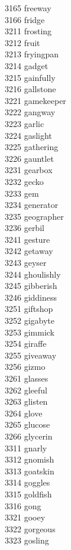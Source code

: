 3165 freeway \\
3166 fridge \\
3211 frosting \\
3212 fruit \\
3213 fryingpan \\
3214 gadget \\
3215 gainfully \\
3216 gallstone \\
3221 gamekeeper \\
3222 gangway \\
3223 garlic \\
3224 gaslight \\
3225 gathering \\
3226 gauntlet \\
3231 gearbox \\
3232 gecko \\
3233 gem \\
3234 generator \\
3235 geographer \\
3236 gerbil \\
3241 gesture \\
3242 getaway \\
3243 geyser \\
3244 ghoulishly \\
3245 gibberish \\
3246 giddiness \\
3251 giftshop \\
3252 gigabyte \\
3253 gimmick \\
3254 giraffe \\
3255 giveaway \\
3256 gizmo \\
3261 glasses \\
3262 gleeful \\
3263 glisten \\
3264 glove \\
3265 glucose \\
3266 glycerin \\
3311 gnarly \\
3312 gnomish \\
3313 goatskin \\
3314 goggles \\
3315 goldfish \\
3316 gong \\
3321 gooey \\
3322 gorgeous \\
3323 gosling \\
